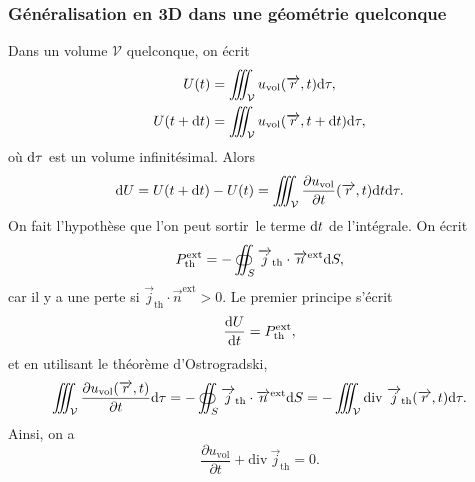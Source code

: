        \subsubsection{Généralisation en 3D dans une géométrie quelconque}
            
            Dans un volume $\mathcal{V}$ quelconque, on écrit
            \begin{equation*}
                \begin{aligned}
                    U(t)&=\iiint_{\mathcal{V}}u_{\text{vol}}(\protect\overrightarrow{{r}},t)\mathrm{d}\tau,\\
                    U(t+\mathrm{d} t)&=\iiint_{\mathcal{V}}u_{\text{vol}}(\protect\overrightarrow{{r}},t+\mathrm{d} t)\mathrm{d}\tau,\\
                \end{aligned}
            \end{equation*}
            où $\mathrm{d}\tau$ est un volume infinitésimal. Alors
            \begin{equation*}
                \mathrm{d} U=U(t+\mathrm{d} t)-U(t)=\iiint_{\mathcal{V}}\frac{\partial u_{\text{vol}}}{\partial t}(\protect\overrightarrow{{r}},t)\mathrm{d} t\mathrm{d}\tau.
            \end{equation*}
            On fait l'hypothèse que l'on peut \og sortir\fg~le terme $\mathrm{d} t$ de l'intégrale. On écrit
            \begin{equation*}
                P_{\text{th}}^{\text{ext}}=-\oiint_{S}\protect\overrightarrow{{j}}_{\text{th}}\cdot\protect\overrightarrow{{n}}^{\text{ext}}\mathrm{d} S,
            \end{equation*}
            car il y a une perte si $\vec{j}_{\text{th}}\cdot\vec{n}^{\text{ext}}>0$. Le premier principe s'écrit 
            \begin{equation*}
                \frac{\mathrm{d} U}{\mathrm{d} t}=P_{\text{th}}^{\text{ext}},
            \end{equation*}
            et en utilisant le théorème d'Ostrogradski,
            \begin{equation*}
                \iiint_{\mathcal{V}}\frac{\partial u_{\text{vol}}(\protect\overrightarrow{{r}},t)}{\partial t}\mathrm{d}\tau=-\oiint_{S}\protect\overrightarrow{{j}}_{\text{th}}\cdot\protect\overrightarrow{{n}}^{\text{ext}}\mathrm{d} S=-\iiint_{\mathcal{V}}\mathrm{div}~\protect\overrightarrow{{j}}_{\text{th}}(\protect\overrightarrow{{r}},t)\mathrm{d}\tau.
            \end{equation*}
            Ainsi, on a 
            \begin{equation*}
                \boxed{
                    \frac{\partial u_{\text{vol}}}{\partial t}+\mathrm{div}~\vec{j}_{\text{th}}=0.
                }
            \end{equation*}

